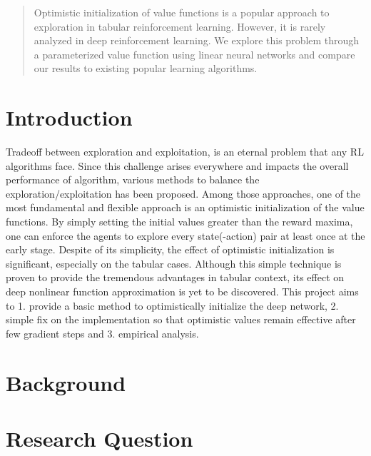 \documentclass{article}
\theoremstyle{plain}
\theoremstyle{definition}
\theoremstyle{remark}
\begin{document}
\begin{abstract}
Optimistic initialization of value functions is a popular approach to exploration
in tabular reinforcement learning. However, it is rarely analyzed
in deep reinforcement learning. We explore this problem through a parameterized
value function using linear neural networks and compare our results to existing popular 
learning algorithms.
\end{abstract}

\section{Introduction}
Tradeoff between exploration and exploitation, is an eternal problem that any RL algorithms face.
Since this challenge arises everywhere and impacts the overall performance of algorithm, various methods to balance the exploration/exploitation has been proposed.
Among those approaches, one of the most fundamental and flexible approach is an optimistic initialization of the value functions.
By simply setting the initial values greater than the reward maxima, one can enforce the agents to explore every state(-action) pair at least once at the early stage.
Despite of its simplicity, the effect of optimistic initialization is significant, especially on the tabular cases.
Although this simple technique is proven to provide the tremendous advantages in tabular context, its effect on deep nonlinear function approximation is yet to be discovered.
This project aims to 1. provide a basic method to optimistically initialize the deep network, 2. simple fix on the implementation so that optimistic values remain effective after few gradient steps and 3. empirical analysis.


\medskip
\section{Background}


\section{Research Question}
\end{document}
